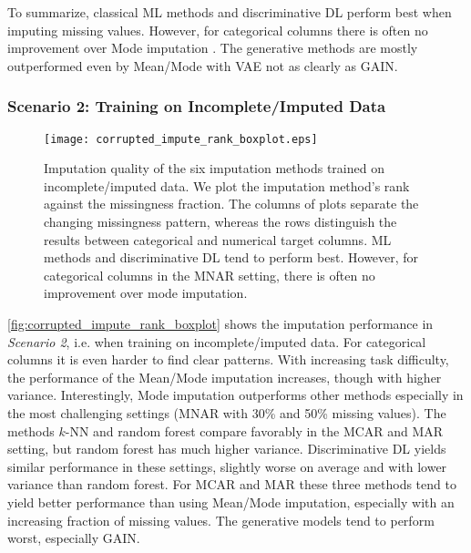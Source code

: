To summarize, classical ML methods and discriminative DL perform best when imputing missing values. However, for categorical columns there is often no improvement over Mode imputation . The generative methods are mostly outperformed even by Mean/Mode with VAE not as clearly as GAIN.


\subsubsection{Scenario 2: Training on Incomplete/Imputed Data}


\begin{figure}\centering
    \texttt{[image: corrupted\_impute\_rank\_boxplot.eps]}

    \caption[Imputation Ranks - Corrupted]{Imputation quality of the six imputation methods trained on incomplete/imputed data. We plot the imputation method's rank against the missingness fraction. The columns of plots separate the changing missingness pattern, whereas the rows distinguish the results between categorical and numerical target columns. ML methods and discriminative DL tend to perform best. However, for categorical columns in the MNAR setting, there is often no improvement over mode imputation. 
    }
	\label{fig:corrupted_impute_rank_boxplot}
\end{figure}

\autoref{fig:corrupted_impute_rank_boxplot} shows the imputation performance in \textit{Scenario 2}, i.e. when training on incomplete/imputed data. For categorical columns it is even harder to find clear patterns. With increasing task difficulty, the performance of the Mean/Mode imputation increases, though with higher variance. Interestingly, Mode imputation outperforms other methods especially in the most challenging settings (MNAR with 30\% and 50\% missing values). The methods $k$-NN and random forest compare favorably in the MCAR and MAR setting, but random forest has much higher variance. Discriminative DL yields similar performance in these settings, slightly worse on average and with lower variance than random forest. For MCAR and MAR these three methods tend to yield better performance than using Mean/Mode imputation, especially with an increasing fraction of missing values. The generative models tend to perform worst, especially GAIN.

